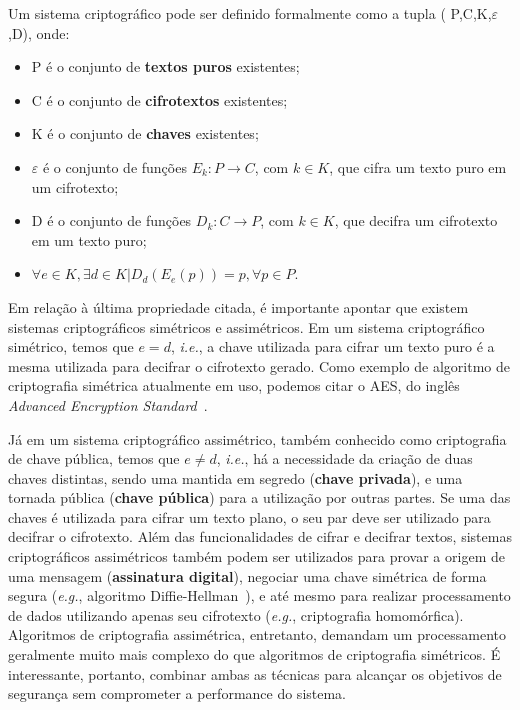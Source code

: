 Um sistema criptográfico pode ser definido formalmente como a tupla ({\ttfamily
P,C,K,$\varepsilon$,D}), onde:
\begin{itemize}
    \item {\ttfamily P} é o conjunto de \textbf{textos puros} existentes;
    \item {\ttfamily C} é o conjunto de \textbf{cifrotextos} existentes;
    \item {\ttfamily K} é o conjunto de \textbf{chaves} existentes;
    \item {\ttfamily $\varepsilon$} é o conjunto de funções $E_{k}: P
    \rightarrow C$, com $k \in K$, que cifra um texto puro em um cifrotexto;
    \item {\ttfamily D} é o conjunto de funções $D_{k}: C
    \rightarrow P$, com $k \in K$, que decifra um cifrotexto em um texto puro;
    \item $\forall e \in K, \exists d \in K | D_{d}(E_{e}(p)) = p, \forall p \in
    P$.
\end{itemize}

Em relação à última propriedade citada, é importante apontar que existem
sistemas criptográficos simétricos e assimétricos. Em um sistema criptográfico
simétrico, temos que $e = d$, \textit{i.e.}, a chave utilizada para cifrar um
texto puro é a mesma utilizada para decifrar o cifrotexto gerado. Como exemplo
de algoritmo de criptografia simétrica atualmente em uso, podemos citar o AES,
do inglês \textit{Advanced Encryption Standard}~\cite{aes2001}.

Já em um sistema criptográfico assimétrico, também conhecido como criptografia
de chave pública, temos que $e \neq d$, \textit{i.e.}, há a necessidade da
criação de duas chaves distintas, sendo uma mantida em segredo (\textbf{chave
privada}), e uma tornada pública (\textbf{chave pública}) para a utilização por
outras partes. Se uma das chaves é utilizada para cifrar um texto plano, o seu
par deve ser utilizado para decifrar o cifrotexto. Além das funcionalidades de
cifrar e decifrar textos, sistemas criptográficos assimétricos também podem ser
utilizados para provar a origem de uma mensagem (\textbf{assinatura digital}),
negociar uma chave simétrica de forma segura (\textit{e.g.}, algoritmo 
Diffie-Hellman~\cite{merkle1978secure}), e até mesmo para realizar processamento
de dados utilizando apenas seu cifrotexto (\textit{e.g.}, criptografia
homomórfica). Algoritmos de criptografia assimétrica, entretanto, demandam um
processamento geralmente muito mais complexo do que algoritmos de criptografia
simétricos. É interessante, portanto, combinar ambas as técnicas para alcançar
os objetivos de segurança sem comprometer a performance do sistema.

